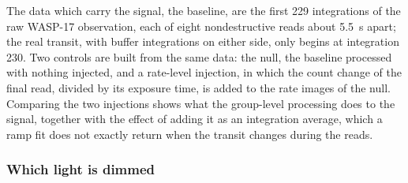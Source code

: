 The data which carry the signal, the baseline, are the first 229
integrations of the raw WASP-17 observation, each of eight nondestructive
reads about 5.5~s apart; the real transit, with buffer integrations on either
side, only begins at integration 230. Two controls are built from the same
data: the null, the baseline processed with nothing injected, and a
rate-level injection, in which the count change of the final read, divided by
its exposure time, is added to the rate images of the null. Comparing the two
injections shows what the group-level processing does to the signal,
together with the effect of adding it as an integration average, which a ramp
fit does not exactly return when the transit changes during the reads.

\subsubsection{Which light is dimmed}
\label{sec:dimmed-light}

